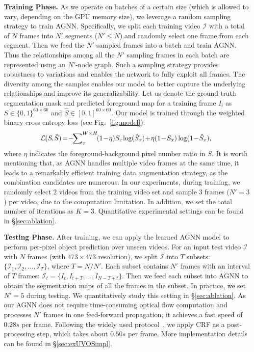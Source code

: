 \documentclass[10pt,twocolumn,letterpaper]{article}
\begin{document}
\noindent\textbf{Training Phase.} As we operate on batches of a certain size (which is allowed to vary, depending on the GPU memory size), we leverage a random sampling strategy to train AGNN. Specifically, we split each training video $\mathcal{I}$ with a total of $N$ frames into $N'$ segments ($N'\!\leq\!N$) and randomly select one frame from each segment. Then we feed the $N'$ sampled frames into a batch and train AGNN. Thus the relationships among all the $N'$ sampling frames in each batch are represented using an $N'$-node graph. Such a sampling strategy provides robustness to variations and enables the network to fully exploit all frames. The diversity among the samples enables our model to better capture the underlying relationships and improve its generalizability. Let us denote the ground-truth segmentation mask and predicted foreground map for a training frame $I_i$ as $S\!\in\!\{0,1\}^{60\times 60}$ and $\hat{S}\!\in\![0,1]^{60\times 60}$. Our model is trained through the weighted binary cross entropy loss  (see Fig.~\ref{fig:model}):
	\vspace*{-3pt}
\begin{equation}\small
\!\!\!\!\mathcal{L}(S\!, \hat{S})\!=\!-\!\!\sum^{W\times H}\nolimits_{x} \!(1\!-\!{\eta}) {S}_{x\!}\log({\hat{S}_{x}})\! +\!  {\eta}(1\!-\!{S}_{x})\log(1\!-\!{\hat{S}_{x}}),\!\!
\label{focal_loss}	
	\vspace*{-0pt}
\end{equation}
where $\eta$ indicates the foreground-background pixel number ratio in $S$.
It is worth mentioning that, as AGNN handles multiple video frames at the same time, it leads to a remarkably efficient training data augmentation strategy, as the combination candidates are numerous. In our experiments, during training, we randomly select 2 videos from the training video set and sample 3 frames ($N'\!=\!3$) per video, due to the computation limitation. In addition, we set the total number of iterations as $K\!=\!3$. Quantitative experimental settings can be found in \S\ref{sec:ablation}.

\noindent\textbf{Testing Phase.} After training, we can apply the learned AGNN model to perform per-pixel object prediction over unseen videos. For an input test video $\mathcal{I}$ with $N$ frames (with $473\!\times\!473$ resolution), we split $\mathcal{I}$ into $T$ subsets: $\{\mathcal{I}_1,\mathcal{I}_2,\dots,\mathcal{I}_T\}$, where $T\!=\!N/N'$. Each subset contains $N'$ frames with an interval of $T$ frames: $\mathcal{I}_t\!=\!\{I_t,I_{t+T},\dots,I_{N-T+t}\}$. Then we feed each subset into AGNN to obtain the segmentation maps of all the frames in the subset. In practice, we set $N'\!=\!5$ during testing. We quantitatively study this setting in \S\ref{sec:ablation}. As our AGNN does not require time-consuming optical flow computation and processes $N'$ frames in one feed-forward propagation, it achieves a fast speed of $0.28s$ per frame.  Following the widely used protocol~\cite{DBLP:conf/iccv/TokmakovAS17,DBLP:conf/cvpr/TokmakovAS17,Song_2018_ECCV}, we apply CRF as a post-processing step, which takes about $0.50s$ per frame. More implementation details can be found in \S\ref{sec:exUVOSimpl}.
\end{document}
